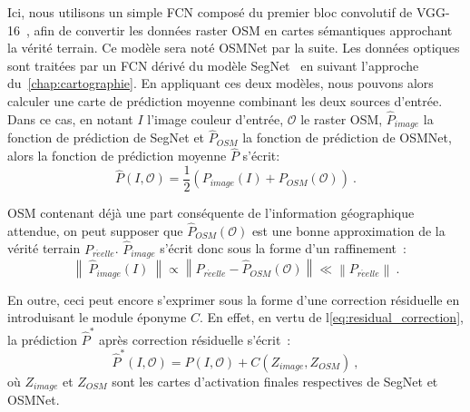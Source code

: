 Ici, nous utilisons un simple \gls{FCN} composé du premier bloc convolutif de VGG-16~\cite{simonyan_very_2014}, afin de convertir les données raster \gls{OSM} en cartes sémantiques approchant la vérité terrain. Ce modèle sera noté OSMNet par la suite. Les données optiques sont traitées par un \gls{FCN} dérivé du modèle SegNet~\cite{badrinarayanan_segnet_2017} en suivant l'approche du~\cref{chap:cartographie}. En appliquant ces deux modèles, nous pouvons alors calculer une carte de prédiction moyenne combinant les deux sources d'entrée. Dans ce cas, en notant $I$ l'image couleur d'entrée, $\mathcal{O}$ le raster \gls{OSM}, $\hat{P}_\mathit{image}$ la fonction de prédiction de SegNet et $\hat{P}_\mathit{OSM}$ la fonction de prédiction de OSMNet, alors la fonction de prédiction moyenne $\hat{P}$ s'écrit:
\begin{equation}
\hat{P}(I, \mathcal{O}) = \frac{1}{2} (P_\mathit{image}(I) + P_\mathit{OSM}(\mathcal{O}))~.
\end{equation}

\gls{OSM} contenant déjà une part conséquente de l'information géographique attendue, on peut supposer que $\hat{P}_\mathit{OSM}(\mathcal{O})$ est une bonne approximation de la vérité terrain $P_\mathit{r\acute{e}elle}$. $\hat{P}_\mathit{image}$ s'écrit donc sous la forme d'un raffinement~\cite{lin_refinenet_2016}:
\begin{equation}
\left\lVert~\hat{P}_\mathit{image}(I)~\right\rVert \propto \left\lVert P_\mathit{r\acute{e}elle} - \hat{P}_\mathit{OSM}(\mathcal{O}) \right\rVert \ll \left\lVert P_\mathit{r\acute{e}elle} \right\rVert~.
\end{equation}

En outre, ceci peut encore s'exprimer sous la forme d'une correction résiduelle en introduisant le module éponyme $C$. En effet, en vertu de l\cref{eq:residual_correction}, la prédiction $\hat{P}^*$ après correction résiduelle s'écrit~:
\begin{equation}
\hat{P}^*(I, \mathcal{O}) = \hat{P}(I, \mathcal{O}) + C\left(Z_\mathit{image}, Z_\mathit{OSM}\right)~,
\end{equation}
où $Z_\mathit{image}$ et $Z_\mathit{OSM}$ sont les cartes d'activation finales respectives de SegNet et OSMNet.

